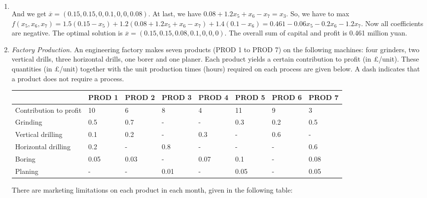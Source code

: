\documentclass[12pt,a4paper]{article}
\makeatletter
\newtheorem*{solution}{Solution}
\theoremstyle{definition}
\renewenvironment{solution}[1][Solution] {\par\pushQED{\qed}\normalfont\topsep6\p@\@plus6\p@\relax\trivlist\item[\hskip\labelsep\bfseries#1\@addpunct{.}]\ignorespaces}{\popQED\endtrivlist\@endpefalse} \makeatother
\makeatother
\begin{document}
\begin{enumerate}
\begin{solution}
\begin{enumerate}
\begin{align*}
        \end{align*}
        And we get $\overline{x} = (0.15,0.15,0,0.1,0,0,0.08)$. At last, we have $0.08+1.2x_5 +x_6-x_7=x_3$. So, we have to max $f(x_5,x_6,x_7) = 1.5(0.15-x_5) + 1.2(0.08+1.2x_5 +x_6-x_7)+1.4(0.1-x_6) = 0.461-0.06x_5-0.2x_6-1.2x_7$. Now all coefficients are negative. The optimal solution is $\overline{x} = (0.15,0.15,0.08,0.1,0,0,0)$. The overall sum of capital and profit is 0.461 million yuan.
    \end{enumerate}
    \end{solution}
    \item
    \textit{Factory Production.} An engineering factory makes seven products (PROD 1 to PROD 7) on the following machines: four grinders, two vertical drills, three horizontal drills, one borer and one planer. Each product yields a certain contribution to profit (in \pounds/unit). These quantities (in \pounds/unit) together with the unit production times (hours) required on each process are given below. A dash indicates that a product does not require a process.

    \begin{table}[htbp]
      \scriptsize
      \centering
      \renewcommand\arraystretch{1.1}
      \begin{tabular}{m{} m{}<{\centering} m{}<{\centering} m{}<{\centering} m{}<{\centering} m{}<{\centering} m{}<{\centering} m{}<{\centering}}
      \hline
       & \textbf{PROD 1} & \textbf{PROD 2} & \textbf{PROD 3} & \textbf{PROD 4} & \textbf{PROD 5} & \textbf{PROD 6} &  \textbf{PROD 7} \\\hline
      Contribution to profit & 10 & 6 & 8 & 4 & 11 & 9 & 3 \\
      Grinding & 0.5 & 0.7 & - & - & 0.3 & 0.2 & 0.5 \\
      Vertical drilling & 0.1 & 0.2 & - & 0.3 & - & 0.6 & - \\
      Horizontal drilling & 0.2 & - & 0.8 & - & - & - & 0.6 \\
      Boring & 0.05 & 0.03 & - & 0.07 & 0.1 & - & 0.08 \\
      Planing & - & - & 0.01 & - & 0.05 & - & 0.05 \\
      \hline
      \end{tabular}
    \end{table}

    There are marketing limitations on each product in each month, given in the following table:


\end{enumerate}
\end{document}
